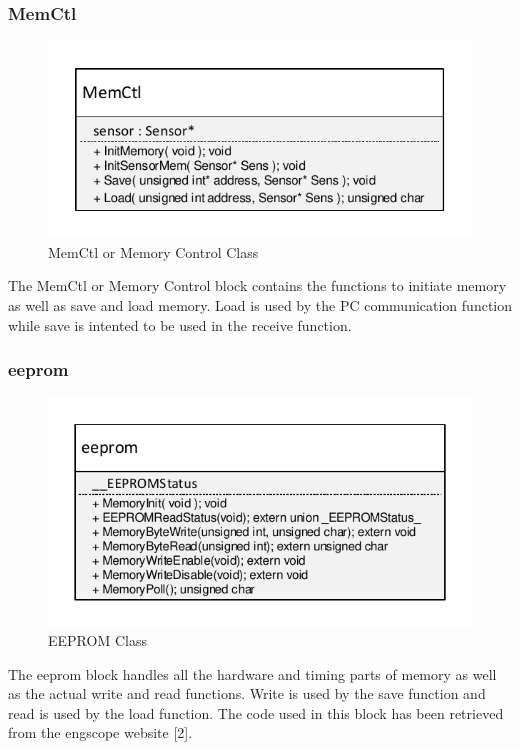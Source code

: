 \subsubsection{MemCtl}
\begin{figure}[H]
\centering
\includegraphics[scale=0.9]{billeder/CDUMemCtlClass}
\caption{MemCtl or Memory Control Class}
\label{fig:cdumcclass}
\end{figure}
The MemCtl or Memory Control block contains the functions to initiate memory as well as save and load memory. Load is used by the PC communication function while save is intented to be used in the receive function. 
\subsubsection{eeprom}
\begin{figure}[H]
\centering
\includegraphics[scale=0.9]{billeder/CDUEEPROMClass}
\caption{EEPROM Class}
\label{fig:cduEEPclass}
\end{figure}
The eeprom block handles all the hardware and timing parts of memory as well as the actual write and read functions. Write is used by the save function and read is used by the load function. The code used in this block has been retrieved from the engscope website [2].

